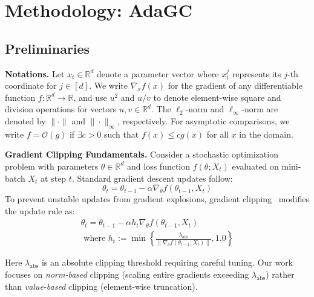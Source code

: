\section{Methodology: AdaGC}
\label{sec:adagc}

\subsection{Preliminaries}
\textbf{Notations.} Let $x_t \in \mathbb{R}^d$ denote a parameter vector where $x_t^j$ represents its $j$-th coordinate for $j \in [d]$. We write $\nabla_x f(x)$ for the gradient of any differentiable function $f: \mathbb{R}^d \rightarrow \mathbb{R}$, and use $u^2$ and $u/v$ to denote element-wise square and division operations for vectors $u,v \in \mathbb{R}^d$. The $\ell_2$-norm and $\ell_\infty$-norm are denoted by $\|\cdot\|$ and $\|\cdot\|_\infty$, respectively. For asymptotic comparisons, we write $f = \mathcal{O}(g)$ if $\exists c > 0$ such that $f(x) \leq cg(x)$ for all $x$ in the domain.

\textbf{Gradient Clipping Fundamentals.} Consider a stochastic optimization problem with parameters $\theta \in \mathbb{R}^d$ and loss function $f(\theta; X_t)$ evaluated on mini-batch $X_t$ at step $t$. Standard gradient descent updates follow:
\begin{equation}
    \theta_t = \theta_{t-1} - \alpha \nabla_\theta f(\theta_{t-1}, X_t)
\end{equation}
To prevent unstable updates from gradient explosions, gradient clipping~\cite{pascanu2013difficulty} modifies the update rule as:
\begin{equation}
    \begin{array}{c}
    \theta_t = \theta_{t-1} - \alpha h_t \nabla_{\theta}f(\theta_{t-1}, X_t) \\[0.4em]
    \text{ where } h_t := \min \left\{\frac{\lambda_{abs}}{\|\nabla_{\theta}f(\theta_{t-1}; X_{t})\|}, 1.0 \right\} 
    \end{array}
\end{equation}

Here $\lambda_{\text{abs}}$ is an absolute clipping threshold requiring careful tuning. Our work focuses on \textit{norm-based} clipping (scaling entire gradients exceeding $\lambda_{\text{abs}}$) rather than \textit{value-based} clipping (element-wise truncation).

